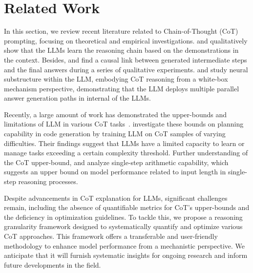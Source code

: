 \section{Related Work}\vspace{-5pt}
In this section, we review recent literature related to Chain-of-Thought (CoT) prompting, focusing on theoretical and empirical investigations.
\citet{madaan-etal-2023-makes,wang-etal-2023-towards,saparov2023language,he2023solving,zhang2024pattern,wang2024rethinking} and \citet{prystawski2024think} qualitatively show that the LLMs learn the reasoning chain based on the demonstrations in the context.
Besides, \citet{lampinen-etal-2022-language} and \citet{tan-2023-causal} find a causal link between generated intermediate steps and the final answers during a series of qualitative experiments. \citet{wang2023large,hanna2024does} and \citet{dutta2024think} study neural substructure within the LLM, embodying CoT reasoning from a white-box mechanism perspective, demonstrating that the LLM deploys multiple parallel answer generation paths in internal of the LLMs.

Recently, a large amount of work has demonstrated the upper-bounds and limitations of LLM in various CoT tasks~\citep{qin2023cross,imani2023mathprompter,huang2024far,sprague2024musr}.
\citet{bi2024program} investigate these bounds on planning capability in code generation by training LLM on CoT samples of varying difficulties. Their findings suggest that LLMs have a limited capacity to learn or manage tasks exceeding a certain complexity threshold.
Further understanding of the CoT upper-bound, \citet{merrill2023expressive,li2023chain} and \citet{feng2024towards} analyze single-step arithmetic capability, which suggests an upper bound on model performance related to input length in single-step reasoning processes.


Despite advancements in CoT explanation for LLMs, significant challenges remain, including the absence of quantifiable metrics for CoT's upper-bounds and the deficiency in optimization guidelines. To tackle this, we propose a reasoning granularity framework designed to systematically quantify and optimize various CoT approaches. This framework offers a transferable and user-friendly methodology to enhance model performance from a mechanistic perspective. We anticipate that it will furnish systematic insights for ongoing research and inform future developments in the field.\vspace{-5pt}